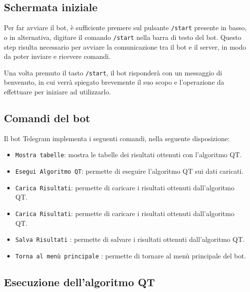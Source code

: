 \subsection{Schermata iniziale}

Per far avviare il bot, è sufficiente premere sul pulsante \texttt{/start} presente in basso, o in alternativa, digitare il comando \texttt{/start} nella barra di testo del bot. Questo step risulta necessario per avviare la comunicazione tra il bot e il server, in modo da poter inviare e ricevere comandi.


Una volta premuto il tasto \texttt{/start}, il bot risponderà con un messaggio di benvenuto, in cui verrà spiegato brevemente il suo scopo e l'operazione da effettuare per iniziare ad utilizzarlo.


\subsection{Comandi del bot}

Il bot Telegram implementa i seguenti comandi, nella seguente disposizione:

\begin{multicols}{2}
        \begin{itemize}
            \item \texttt{Mostra tabelle}: mostra le tabelle dei risultati ottenuti con l'algoritmo QT.
            \item \texttt{Esegui Algoritmo QT}: permette di eseguire l'algoritmo QT sui dati caricati.
            \item \texttt{Carica Risultati}: permette di caricare i risultati ottenuti dall'algoritmo QT.
            \item \texttt{Carica Risultati}: permette di caricare i risultati ottenuti dall'algoritmo QT.
            \item \texttt{Salva Risultati} : permette di salvare i risultati ottenuti dall'algoritmo QT.
            \item \texttt{Torna al menù principale} :   permette di tornare al menù principale del bot.
        \end{itemize}
\end{multicols}

\subsection{Esecuzione dell'algoritmo QT}

